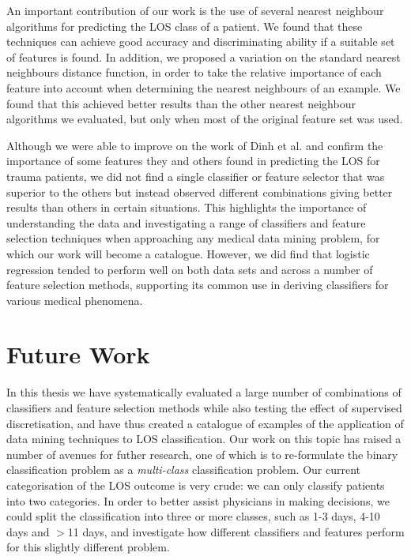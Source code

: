 An important contribution of our work is the use of several nearest neighbour
algorithms for predicting the LOS class of a patient. We found that these
techniques can achieve good accuracy and discriminating ability if a suitable
set of features is found. In addition, we proposed a variation on the standard
nearest neighbours distance function, in order to take the relative importance
of each feature into account when determining the nearest neighbours of an
example. We found that this achieved better results than the other nearest
neighbour algorithms we evaluated, but only when most of the original feature
set was used.

Although we were able to improve on the work of Dinh et al. and confirm the
importance of some features they and others found in predicting the LOS for
trauma patients, we did not find a single classifier or feature selector
that was superior to the others but instead observed different combinations
giving better results than others in certain situations. This highlights the
importance of understanding the data and investigating a range of classifiers
and feature selection techniques when approaching any medical data mining
problem, for which our work will become a catalogue.
However, we did find that logistic regression tended to perform well
on both data sets and across a number of feature selection methods, supporting
its common use in deriving classifiers for various medical phenomena.

\section{Future Work}
In this thesis we have systematically evaluated a large number of combinations
of classifiers and feature selection methods while also testing the effect of
supervised discretisation, and have thus created a catalogue of examples of
the application of data mining techniques to LOS classification. Our work on
this topic has raised a number of avenues for futher research, one of which is
to re-formulate the binary classification problem as a \textit{multi-class}
classification problem. Our current categorisation of the LOS outcome is very
crude: we can only classify patients into two categories. In order to better
assist physicians in making decisions, we could split the classification into
three or more classes, such as 1-3 days, 4-10 days and $>$11 days, and
investigate how different classifiers and features perform for this slightly
different problem.

